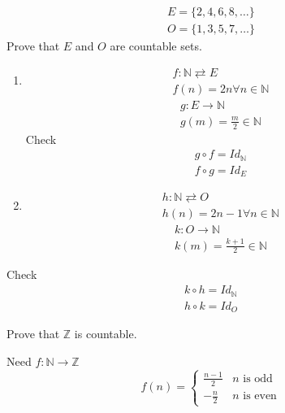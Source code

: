 \documentclass[letterpaper, 12pt]{article}
\newenvironment{proof}[1][Proof]{\begin{trivlist}
\item[\hskip \labelsep {\bfseries #1}]}{\end{trivlist}}
\newenvironment{example}[1][Example]{\begin{trivlist}
\item[\hskip \labelsep {\bfseries #1}]}{\end{trivlist}}
\newcommand{\naturals}{\mathbb{N}}
\newcommand{\integers}{\mathbb{Z}}
\begin{document}
    \begin{example}
        \begin{gather*}
            E = \{2, 4, 6, 8, \dots\} \\
            O = \{1, 3, 5, 7, \dots\}
        \end{gather*}
        Prove that $E$ and $O$ are countable sets.
        \begin{enumerate}
            \item \begin{gather*}
                f: \naturals \rightleftarrows E \\
                f(n) = 2n \forall n \in \naturals
            \end{gather*}
            \begin{gather*}
                g: E \rightarrow \naturals \\
                g(m) = \frac{m}{2} \in \naturals
            \end{gather*}
            Check \begin{gather*}
                g \circ f = Id_\naturals \\
                f \circ g = Id_E
            \end{gather*}
            \item \begin{gather*}
                h: \naturals \rightleftarrows O \\
                h(n) = 2n - 1 \forall n \in \naturals
            \end{gather*}
            \begin{gather*}
                k: O \rightarrow \naturals \\
                k(m) = \frac{k + 1}{2} \in \naturals
            \end{gather*}
        \end{enumerate}
        Check \begin{gather*}
            k \circ h = Id_\naturals \\
            h \circ k = Id_O
        \end{gather*}
    \end{example}
    \begin{example}
        Prove that $\integers$ is countable.
        \begin{proof}
            Need $f: \naturals \rightarrow \integers$
            \[f(n) =\begin{cases}
                \frac{n - 1}{2} & n \text{ is odd} \\
                -\frac{n}{2} & n \text{ is even}
            \end{cases}\]
        \end{proof}
    \end{example}
\end{document}
